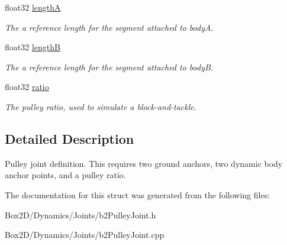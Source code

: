 \begin{DoxyCompactItemize}
float32 \hyperlink{structb2_pulley_joint_def_a51d945882c1d7a78af2b0e9ffb31a33b}{lengthA}
\begin{DoxyCompactList}\small\item\em The a reference length for the segment attached to bodyA. \end{DoxyCompactList}\item 
\mbox{\label{structb2_pulley_joint_def_a5857d5b5b9880b6c8201ce3ee8c3eef0}} 
float32 \hyperlink{structb2_pulley_joint_def_a5857d5b5b9880b6c8201ce3ee8c3eef0}{lengthB}
\begin{DoxyCompactList}\small\item\em The a reference length for the segment attached to bodyB. \end{DoxyCompactList}\item 
\mbox{\label{structb2_pulley_joint_def_af35074246aeacbf239c11682642b31f5}} 
float32 \hyperlink{structb2_pulley_joint_def_af35074246aeacbf239c11682642b31f5}{ratio}
\begin{DoxyCompactList}\small\item\em The pulley ratio, used to simulate a block-\/and-\/tackle. \end{DoxyCompactList}\end{DoxyCompactItemize}


\subsection{Detailed Description}
Pulley joint definition. This requires two ground anchors, two dynamic body anchor points, and a pulley ratio. 

The documentation for this struct was generated from the following files\+:\begin{DoxyCompactItemize}
\item 
Box2\+D/\+Dynamics/\+Joints/b2\+Pulley\+Joint.\+h\item 
Box2\+D/\+Dynamics/\+Joints/b2\+Pulley\+Joint.\+cpp\end{DoxyCompactItemize}
